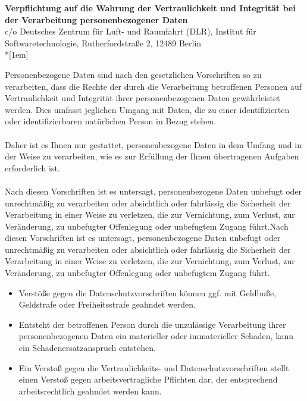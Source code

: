 \documentclass[../Vorlagen/de-RSE_Kopf,a4paper]{scrlttr2}
\begin{document}
\thispagestyle{headings}
\vspace{-8.5cm}
\begin{centering}
{\large\textbf{Verpflichtung auf die Wahrung der Vertraulichkeit und Integrität bei der Verarbeitung personenbezogener Daten}}\\
{\tiny c/o Deutsches Zentrum für Luft- und Raumfahrt (DLR), Institut für Softwaretechnologie, Rutherfordstraße 2, 12489 Berlin}\\*[1em]
\end{centering}
\vspace{0.5cm}

Personenbezogene Daten sind nach den gesetzlichen Vorschriften so zu verarbeiten, dass die Rechte der durch die Verarbeitung betroffenen Personen auf Vertraulichkeit und Integrität ihrer personenbezogenen Daten gewährleistet werden. Dies umfasst jeglichen Umgang mit Daten, die zu einer identifizierten oder identifizierbaren natürlichen Person in Bezug stehen. \\
\\
Daher ist es Ihnen nur gestattet, personenbezogene Daten in dem Umfang und in der Weise zu verarbeiten, wie es zur Erfüllung der Ihnen übertragenen Aufgaben erforderlich ist. \\
\\
Nach diesen Vorschriften ist es untersagt, personenbezogene Daten unbefugt oder unrechtmäßig zu verarbeiten oder absichtlich oder fahrlässig die Sicherheit der Verarbeitung in einer Weise zu verletzen, die zur Vernichtung, zum Verlust, zur Veränderung, zu unbefugter Offenlegung oder unbefugtem Zugang führt.Nach diesen Vorschriften ist es untersagt, personenbezogene Daten unbefugt oder unrechtmäßig zu verarbeiten oder absichtlich oder fahrlässig die Sicherheit der Verarbeitung in einer Weise zu verletzen, die zur Vernichtung, zum Verlust, zur Veränderung, zu unbefugter Offenlegung oder unbefugtem Zugang führt. \\

\vspace{-0.5cm}
\begin{itemize}
    \item Verstöße gegen die Datenschutzvorschriften können ggf. mit Geldbuße, Geldstrafe oder Freiheitsstrafe geahndet werden.
    \item Entsteht der betroffenen Person durch die unzulässige Verarbeitung ihrer personenbezogenen Daten ein materieller oder immaterieller Schaden, kann ein Schadenersatzanspruch entstehen.
    \item Ein Verstoß gegen die Vertraulichkeits- und Datenschutzvorschriften stellt einen Verstoß gegen arbeitsvertragliche Pflichten dar, der entsprechend arbeitsrechtlich geahndet werden kann.
\end{itemize}
\end{document}
